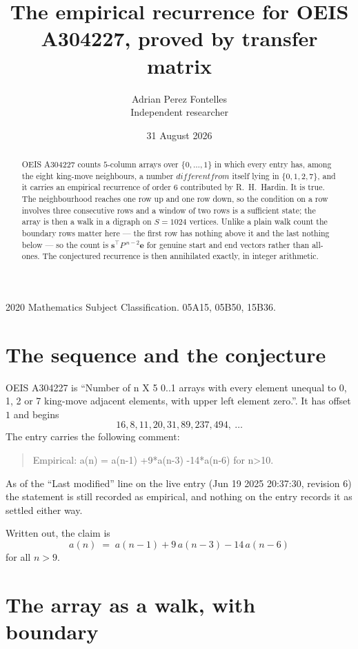 \documentclass[11pt,a4paper]{article}
\title{The empirical recurrence for OEIS A304227, proved by transfer matrix}
\author{Adrian Perez Fontelles\\ \small Independent researcher}
\date{31 August 2026}
\theoremstyle{plain}
\theoremstyle{definition}
\begin{document}
\maketitle

\begin{abstract}
OEIS A304227 counts $5$-column arrays over $\{0,\dots,1\}$ in which every entry has,
among the eight king-move neighbours, a number $different from$ itself lying in $\{0,1,2,7\}$, and it carries an empirical
recurrence of order $6$ contributed by R.~H.~Hardin. It is true. The neighbourhood
reaches one row up and one row down, so the condition on a row involves three consecutive
rows and a window of two rows is a sufficient state; the array is then a walk in a digraph
on $S=1024$ vertices. Unlike a plain walk count the boundary rows matter here --- the first
row has nothing above it and the last nothing below --- so the count is
$\mathbf{s}^{\!\top}P^{\,n-2}\mathbf{e}$ for genuine start and end vectors rather than
all-ones. The conjectured recurrence is then annihilated exactly, in integer arithmetic.
\end{abstract}

\noindent\small 2020 Mathematics Subject Classification. 05A15, 05B50, 15B36.\normalsize

\section{The sequence and the conjecture}

OEIS A304227 is ``Number of n X 5 0..1 arrays with every element unequal to 0, 1, 2 or 7 king-move adjacent elements, with upper left element zero.''. It has offset
$1$ and begins
\[
16, 8, 11, 20, 31, 89, 237, 494,\ \dots
\]
The entry carries the following comment:
\begin{quote}\small
Empirical: a(n) = a(n-1) +9*a(n-3) -14*a(n-6) for n>10.
\end{quote}
As of the ``Last modified'' line on the live entry (Jun 19 2025 20:37:30, revision
6) the statement is still recorded as empirical, and nothing on the entry
records it as settled either way.

Written out, the claim is
\begin{equation}\label{eq:conj}
a(n)\;=\;a(n-1) + 9\,a(n-3) - 14\,a(n-6)
\end{equation}
for all $n>9$.

\section{The array as a walk, with boundary}
\end{document}

